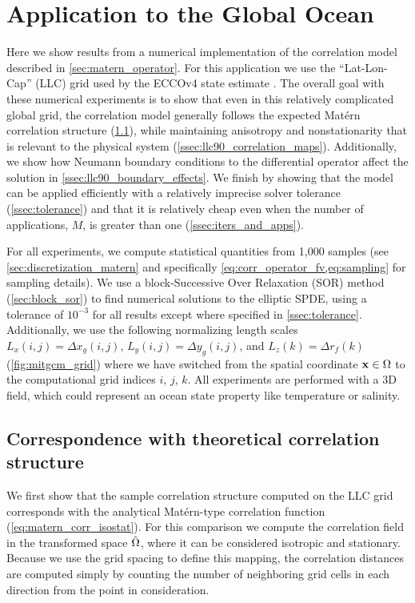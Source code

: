 \section{Application to the Global Ocean}
\label{sec:llc90}

Here we show results from a numerical implementation of the correlation model
described in \cref{sec:matern_operator}.
For this application we use the ``Lat-Lon-Cap'' (LLC) grid used by the ECCOv4
state estimate \cite[][see Sec. 2 for a complete description of the grid]{forgetECCOv4}.
The overall goal with these numerical experiments is to show that even in this
relatively complicated global grid, the
correlation model generally follows the expected Mat\'ern correlation structure
(\cref{ssec:llc90_correlations}), while maintaining
anisotropy and nonstationarity that is relevant to the physical system
(\cref{ssec:llc90_correlation_maps}).
Additionally, we show how Neumann boundary conditions to the differential
operator affect the solution in \cref{ssec:llc90_boundary_effects}.
We finish
by showing that the model can be applied efficiently with a relatively imprecise
solver tolerance (\cref{ssec:tolerance}) and that it is relatively cheap even
when the number of applications, $M$, is greater than one
(\cref{ssec:iters_and_apps}).

For all experiments, we compute statistical quantities from 1,000 samples
(see \cref{sec:discretization_matern} and specifically
\cref{eq:corr_operator_fv,eq:sampling} for sampling details).
We use a block-Successive Over Relaxation (SOR) method (\cref{sec:block_sor}) to find numerical
solutions to the elliptic SPDE, using a tolerance of $10^{-3}$ for all results
except where specified in \cref{ssec:tolerance}.
Additionally, we use the following normalizing length scales
$L_x(i,j) = \Delta x_g(i,j)$, $L_y(i,j) = \Delta y_g(i,j)$,
and $L_z(k) = \Delta r_f(k)$ (\cref{fig:mitgcm_grid}) where we have switched
from the spatial coordinate $\mathbf{x}\in\Omega$ to the computational grid indices $i$, $j$, $k$.
All experiments are performed with a 3D field, which could represent an ocean
state property like temperature or salinity.

\subsection{Correspondence with theoretical correlation structure}
\label{ssec:llc90_correlations}

We first show that the sample correlation structure computed on the LLC
grid corresponds with the analytical Mat\'ern-type correlation function
(\cref{eq:matern_corr_isostat}).
For this comparison we compute the correlation field in the transformed space
$\hat{\Omega}$, where it can be considered isotropic and stationary.
Because we use the grid spacing to define this mapping, the correlation
distances are computed simply by counting the number of neighboring grid cells in each
direction from the point in consideration.

